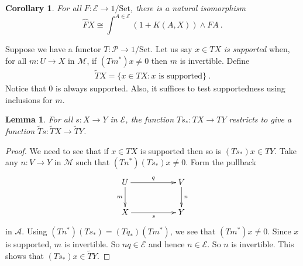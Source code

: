 \documentclass[a4paper,12pt,reqno]{amsart}
\newtheorem{lemma}[theorem]{Lemma}
\newtheorem{corollary}[theorem]{Corollary}
\theoremstyle{definition}
\theoremstyle{fact}
\theoremstyle{genquest}
\theoremstyle{step}
\newcommand{\lra}{\longrightarrow}
\def\CA{{\mathscr A}}
\def\CE{{\mathscr E}}
\def\CM{{\mathscr M}}
\def\CP{{\mathscr P}}
\begin{document}
\begin{corollary}\label{coendforhat} 
For all $F:\CE \lra 1/\mathrm{Set}$, there is a natural isomorphism
$$\widehat{F}X\cong \int^{A\in \CE}{(1+K(A,X))\wedge FA} \ .$$
\end{corollary}

Suppose we have a functor $T : \CP \lra 1/\mathrm{Set}$.
Let us say $x\in TX$ {\em is supported} when, for all 
$m: U\lra X$ in $\CM$, if $(Tm^*)x \neq 0$ then $m$ is invertible. 
Define 
\begin{eqnarray}\label{fs}
\widetilde{T}X = \{x\in TX : x \text{ is supported} \} \ .
\end{eqnarray}
Notice that $0$ is always supported.
Also, it suffices to test supportedness using inclusions for $m$.

\begin{lemma} For all $s : X \lra Y$ in $\CE$, the function 
$Ts_* : TX \lra TY$ restricts to give a function $\widetilde{T}s : \widetilde{T}X \lra \widetilde{T}Y$.  
\end{lemma}
\begin{proof}
We need to see that if $x\in TX$ is supported then so is $(Ts_*)x\in TY$. 
Take any $n:V\lra Y$ in $\CM$ such that $(Tn^*)(Ts_*)x \neq 0$.
Form the pullback
\begin{equation}\label{pbmse}
\xymatrix{
U \ar[rr]^-{q} \ar[d]_-{m} && V \ar[d]^-{n} \\
X \ar[rr]_-{s} && Y}
\end{equation}
in $\CA$. Using $(Tn^*)(Ts_*) = (Tq_*)(Tm^*)$, we see that 
$(Tm^*)x \neq 0$. Since $x$ is supported, $m$ is invertible.
So $nq \in \CE$ and hence $n\in \CE$.
So $n$ is invertible. This shows that $(Ts_*)x \in \widetilde{T}Y$.   
\end{proof}
\end{document}
